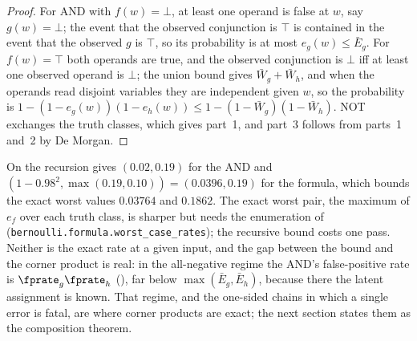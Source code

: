 \begin{proof}
For AND with $f(w) = \bot$, at least one operand is false at $w$, say $g(w) =
\bot$; the event that the observed conjunction is $\top$ is contained in the
event that the observed $g$ is $\top$, so its probability is at most $e_g(w)
\le \bar{E}_g$. For $f(w) = \top$ both operands are true, and the observed
conjunction is $\bot$ iff at least one observed operand is $\bot$; the union
bound gives $\bar{W}_g + \bar{W}_h$, and when the operands read disjoint
variables they are independent given $w$, so the probability is $1 - (1 -
e_g(w))(1 - e_h(w)) \le 1 - (1 - \bar{W}_g)(1 - \bar{W}_h)$. NOT exchanges the
truth classes, which gives part~1, and part~3 follows from parts~1 and~2 by De
Morgan.
\end{proof}

On  the recursion gives $(0.02, 0.19)$ for the
AND and $(1 - 0.98^2, \max(0.19, 0.10)) = (0.0396, 0.19)$ for the formula,
which bounds the exact worst values $0.03764$ and $0.1862$. The exact worst pair,
the maximum of $e_f$ over each truth class, is sharper but needs the enumeration
of  (\texttt{bernoulli.formula.worst\_case\_rates});
the recursive bound costs one pass. Neither is the exact rate at a given input,
and the gap between the bound and the corner product is real: in the
all-negative regime the AND's false-positive rate is $\fprate_g \fprate_h$
(), far below $\max(\bar{E}_g, \bar{E}_h)$, because
there the latent assignment is known. That regime, and the one-sided chains in
which a single error is fatal, are where corner products are exact; the next
section states them as the composition theorem.
